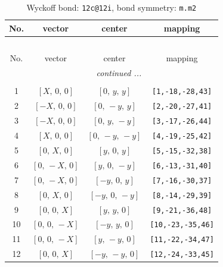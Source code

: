 \documentclass[fleqn,8pt]{jsarticle}
\begin{document}
\begin{longtable}{cccc}
\caption{Wyckoff bond: {\tt 12c@12i}, bond symmetry: {\tt m.m2}}
 \\
 \hline \hline
No. & vector & center & mapping \\ \hline \endfirsthead

\multicolumn{3}{l}{\tablename\ \thetable{}} \\
 \hline \hline
No. & vector & center & mapping \\ \hline \endhead

 \hline \hline
\multicolumn{3}{r}{\footnotesize\it continued ...} \\ \endfoot

 \hline \hline
\multicolumn{3}{r}{} \\ \endlastfoot

1 & $\left[ X,\, 0,\, 0 \right]$ & $\left[ 0,\, y,\, y \right]$ & {\tt [1,-18,-28,43]} \\ \hline
2 & $\left[ - X,\, 0,\, 0 \right]$ & $\left[ 0,\, - y,\, y \right]$ & {\tt [2,-20,-27,41]} \\ \hline
3 & $\left[ - X,\, 0,\, 0 \right]$ & $\left[ 0,\, y,\, - y \right]$ & {\tt [3,-17,-26,44]} \\ \hline
4 & $\left[ X,\, 0,\, 0 \right]$ & $\left[ 0,\, - y,\, - y \right]$ & {\tt [4,-19,-25,42]} \\ \hline
5 & $\left[ 0,\, X,\, 0 \right]$ & $\left[ y,\, 0,\, y \right]$ & {\tt [5,-15,-32,38]} \\ \hline
6 & $\left[ 0,\, - X,\, 0 \right]$ & $\left[ y,\, 0,\, - y \right]$ & {\tt [6,-13,-31,40]} \\ \hline
7 & $\left[ 0,\, - X,\, 0 \right]$ & $\left[ - y,\, 0,\, y \right]$ & {\tt [7,-16,-30,37]} \\ \hline
8 & $\left[ 0,\, X,\, 0 \right]$ & $\left[ - y,\, 0,\, - y \right]$ & {\tt [8,-14,-29,39]} \\ \hline
9 & $\left[ 0,\, 0,\, X \right]$ & $\left[ y,\, y,\, 0 \right]$ & {\tt [9,-21,-36,48]} \\ \hline
10 & $\left[ 0,\, 0,\, - X \right]$ & $\left[ - y,\, y,\, 0 \right]$ & {\tt [10,-23,-35,46]} \\ \hline
11 & $\left[ 0,\, 0,\, - X \right]$ & $\left[ y,\, - y,\, 0 \right]$ & {\tt [11,-22,-34,47]} \\ \hline
12 & $\left[ 0,\, 0,\, X \right]$ & $\left[ - y,\, - y,\, 0 \right]$ & {\tt [12,-24,-33,45]} \\
\end{longtable}
\renewcommand{\arraystretch}{1.2}
\end{document}
